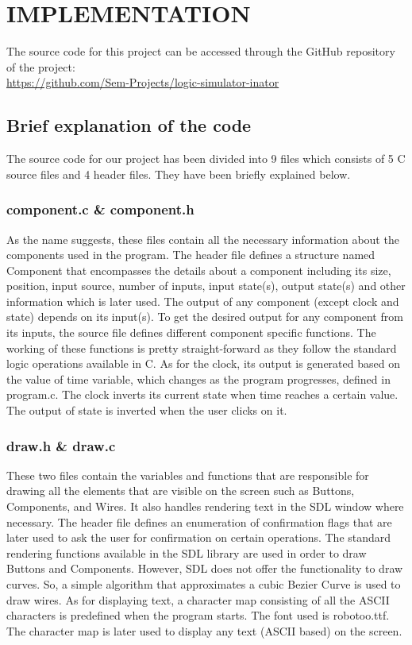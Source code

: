 \documentclass[report]{subfiles}
\begin{document}
    \chapter{IMPLEMENTATION}
    The source code for this project can be accessed through the GitHub repository of the project:\\
    \url{https://github.com/Sem-Projects/logic-simulator-inator}
    \section{Brief explanation of the code}
    The source code for our project has been divided into 9 files which consists of 5 C source files and 4 header files. They have been briefly explained below.
    \subsection{component.c \& component.h}
    As the name suggests, these files contain all the necessary information about the components used in the program. The header file defines a structure named Component that encompasses the details about a component including its size, position, input source, number of inputs, input state(s), output state(s) and other information which is later used.
    The output of any component (except clock and state) depends on its input(s). To get the desired output for any component from its inputs, the source file defines different component specific functions. The working of these functions is pretty straight-forward as they follow the standard logic operations available in C. As for the clock, its output is generated based on the value of time variable, which changes as the program progresses, defined in program.c. The clock inverts its current state when time reaches a certain value. The output of state is inverted when the user clicks on it.
    \subsection{draw.h \& draw.c}
    These two files contain the variables and functions that are responsible for drawing all the elements that are visible on the screen such as Buttons, Components, and Wires. It also handles rendering text in the SDL window where necessary. The header file defines an enumeration of confirmation flags that are later used to ask the user for confirmation on certain operations.
    The standard rendering functions available in the SDL library are used in order to draw Buttons and Components. However, SDL does not offer the functionality to draw curves. So, a simple algorithm that approximates a cubic Bezier Curve is used to draw wires.
    As for displaying text, a character map consisting of all the ASCII characters is predefined when the program starts. The font used is robotoo.ttf. The character map is later used to display any text (ASCII based) on the screen.
\end{document}
